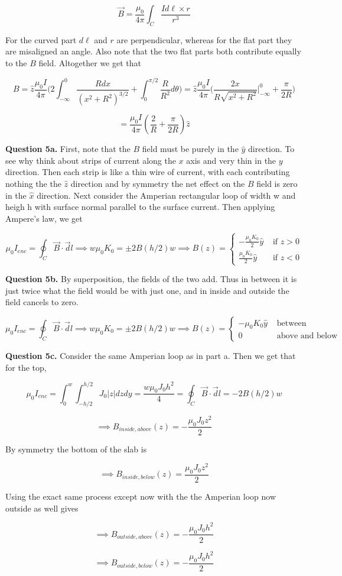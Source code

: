 \documentclass[letterpaper, reqno,11pt]{article}
\begin{document}
\[
    \vec B=\frac{\mu_0}{4\pi}\int_C \frac{Id\ell \times r}{r^3}
\]

For the curved part $d\ell$ and $r$ are perpendicular, whereas for the flat part they are misaligned an angle. Also note that the two flat parts both contribute equally to the $B$ field. Altogether we get that 

\[
    B=\hat z\frac{\mu_0I}{4\pi}\bigg(2\int_{-\infty}^0\frac{Rdx}{(x^2+R^2)^{3/2}}+\int_0^{\pi/2}\frac R{R^2}d\theta\bigg)=\hat z\frac{\mu_0I}{4\pi}\bigg(\frac{2x}{R\sqrt{x^2+R^2}}\bigg|_{-\infty}^0+\frac\pi{2R}\bigg)
\]

\[
    =\frac{\mu_0I}{4\pi}(\frac2R+\frac\pi{2R})\hat z
\]

{\noindent\bf Question 5a.} First, note that the $B$ field must be purely in the $\hat y$ direction. To see why think about strips of current along the $x$ axis and very thin in the $y$ direction. Then each strip is like a thin wire of current, with each contributing nothing the the $\hat z$ direction and by symmetry the net effect on the $B$ field is zero in the $\hat x$ direction. Next consider the Amperian rectangular loop of width w and heigh h with surface normal parallel to the surface current. Then applying Ampere's law, we get 

\[
    \mu_0I_{enc}=\oint_C\vec B\cdot\vec dl\implies w\mu_0K_0=\pm2B(h/2)w\implies B(z)=\begin{cases}-\frac{\mu_0K_0}{2}\hat y&\text{ if }z>0\\\frac{\mu_0K_0}{2}\hat y&\text{ if }z<0\end{cases}
\]

{\noindent\bf Question 5b.} By superposition, the fields of the two add. Thus in between it is just twice what the field would be with just one, and in inside and outside the field cancels to zero. 


\[
    \mu_0I_{enc}=\oint_C\vec B\cdot\vec dl\implies w\mu_0K_0=\pm2B(h/2)w\implies B(z)=\begin{cases}-\mu_0K_0\hat y&\text{ between }\\0&\text{ above and below }\end{cases}
\]

{\noindent\bf Question 5c.} Consider the same Amperian loop as in part a. Then we get that for the top, 

\[
    \mu_0I_{enc}=\int_0^w\int_{-h/2}^{h/2}J_0|z|dz dy=\frac{w\mu_0J_0h^2}4=\oint_C\vec B\cdot\vec dl=-2B(h/2)w
\]

\[
    \implies B_{inside, above}(z)=-\frac{\mu_0J_0z^2}{2}
\]

By symmetry the bottom of the slab is 

\[
    \implies B_{inside, below}(z)=\frac{\mu_0J_0z^2}{2}
\]

Using the exact same process except now with the the Amperian loop now outside as well gives 

\[
    \implies B_{outside, above}(z)=-\frac{\mu_0J_0h^2}{2}
\]


\[
    \implies B_{outside, below}(z)=-\frac{\mu_0J_0h^2}{2}
\]
\end{document}

